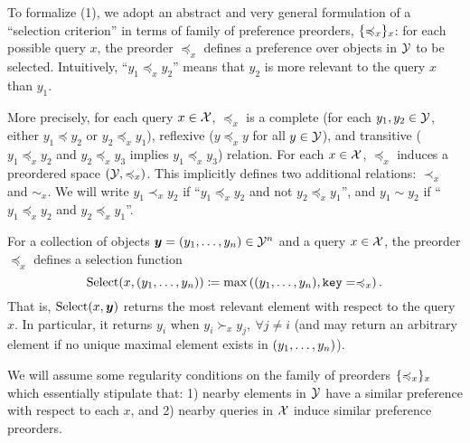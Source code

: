 To formalize (1), we adopt an abstract and very general formulation of a ``selection criterion'' in terms of family of preference preorders, $\{\preccurlyeq_x\}_x$: for each possible query $x$, the preorder $\preceq_x$ defines a preference over objects in ${\mathcal{Y}}$ to be selected. Intuitively, ``$y_1 \preceq_x y_2$'' means that $y_2$ is more relevant to the query $x$ than $y_1$.

More precisely, for each query $x \in {\mathcal{X}}$, $\preceq_x$ is a complete (for each $y_1, y_2 \in {\mathcal{Y}}$, either $y_1 \preceq y_2$ or $y_2 \preceq_x y_1$), reflexive ($y \preceq_x y$ for all $y \in {\mathcal{Y}}$), and transitive ($y_1 \preceq_x y_2$ and $y_2 \preceq_x y_3$ implies $y_1 \preceq_x y_3$) relation. For each $x \in {\mathcal{X}}$, $\preceq_x$ induces a preordered space $({\mathcal{Y}}, \preccurlyeq_x)$. This implicitly defines two additional relations: $\prec_x$ and $\sim_x$. We will write $y_1 \prec_x y_2$ if ``$y_1 \preceq_x y_2$ and not $y_2 \preceq_x y_1$'', and $y_1 \sim y_2$ if ``$y_1 \preceq_x y_2$ and $y_2 \preceq_x y_1$''.

For a collection of objects $\bm{y} = (y_1, \ldots, y_n) \in {\mathcal{Y}}^n$ and a query $x \in {\mathcal{X}}$, the preorder $\preceq_x$ defines a selection function
\begin{equation}\label{eq:def_selection}
  \mathrm{Select}(x, (y_1, \ldots, y_n)) \coloneq \max\left((y_1, \ldots, y_n), \mathtt{key}=\preccurlyeq_x\right).
\end{equation}
That is, $\mathrm{Select}(x, \bm{y})$ returns the most relevant element with respect to the query $x$. In particular, it returns $y_i$ when $y_i \succ_x y_j, \ \forall j \neq i$ (and may return an arbitrary element if no unique maximal element exists in $(y_1, \ldots, y_n)$).

We will assume some regularity conditions on the family of preorders $\{\preccurlyeq_x\}_x$ which essentially stipulate that: 1) nearby elements in ${\mathcal{Y}}$ have a similar preference with respect to each $x$, and 2) nearby queries in ${\mathcal{X}}$ induce similar preference preorders.

